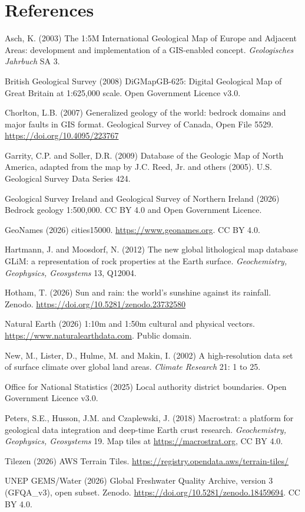 \documentclass[11pt,a4paper]{article}
\begin{document}
\section*{References}
\small
\begin{description}\setlength{\itemsep}{0.2em}
\item Asch, K. (2003) The 1:5M International Geological Map of Europe and Adjacent Areas: development and implementation of a GIS-enabled concept. \emph{Geologisches Jahrbuch} SA 3.
\item British Geological Survey (2008) DiGMapGB-625: Digital Geological Map of Great Britain at 1:625,000 scale. Open Government Licence v3.0.
\item Chorlton, L.B. (2007) Generalized geology of the world: bedrock domains and major faults in GIS format. Geological Survey of Canada, Open File 5529. \url{https://doi.org/10.4095/223767}
\item Garrity, C.P. and Soller, D.R. (2009) Database of the Geologic Map of North America, adapted from the map by J.C. Reed, Jr. and others (2005). U.S. Geological Survey Data Series 424.
\item Geological Survey Ireland and Geological Survey of Northern Ireland (2026) Bedrock geology 1:500,000. CC BY 4.0 and Open Government Licence.
\item GeoNames (2026) cities15000. \url{https://www.geonames.org}. CC BY 4.0.
\item Hartmann, J. and Moosdorf, N. (2012) The new global lithological map database GLiM: a representation of rock properties at the Earth surface. \emph{Geochemistry, Geophysics, Geosystems} 13, Q12004.
\item Hotham, T. (2026) Sun and rain: the world's sunshine against its rainfall. Zenodo. \url{https://doi.org/10.5281/zenodo.23732580}
\item Natural Earth (2026) 1:10m and 1:50m cultural and physical vectors. \url{https://www.naturalearthdata.com}. Public domain.
\item New, M., Lister, D., Hulme, M. and Makin, I. (2002) A high-resolution data set of surface climate over global land areas. \emph{Climate Research} 21: 1 to 25.
\item Office for National Statistics (2025) Local authority district boundaries. Open Government Licence v3.0.
\item Peters, S.E., Husson, J.M. and Czaplewski, J. (2018) Macrostrat: a platform for geological data integration and deep-time Earth crust research. \emph{Geochemistry, Geophysics, Geosystems} 19. Map tiles at \url{https://macrostrat.org}, CC BY 4.0.
\item Tilezen (2026) AWS Terrain Tiles. \url{https://registry.opendata.aws/terrain-tiles/}
\item UNEP GEMS/Water (2026) Global Freshwater Quality Archive, version 3 (GFQA\_v3), open subset. Zenodo. \url{https://doi.org/10.5281/zenodo.18459694}. CC BY 4.0.
\end{description}
\end{document}
